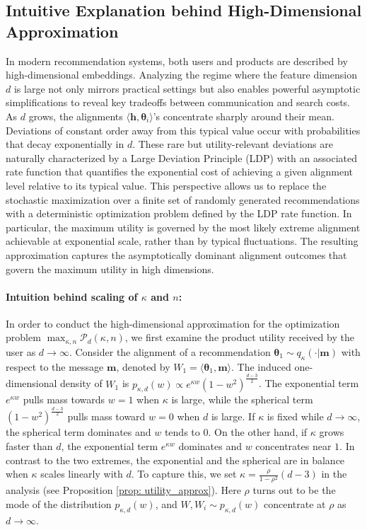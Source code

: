 \documentclass[12pt]{article}
\theoremstyle{definition}
\theoremstyle{remark}
\begin{document}
\subsection{Intuitive Explanation behind High-Dimensional Approximation}
\label{sec:intuitive_high_dim}
In modern recommendation systems, both users and products are described by high-dimensional embeddings. Analyzing the regime where the feature dimension $d$ is large not only mirrors practical settings but also enables powerful asymptotic simplifications to reveal key tradeoffs between communication and search costs. As $d$ grows, the alignments $\langle \mathbf{h}, \boldsymbol{\theta}_i \rangle$'s concentrate sharply around their mean. Deviations of constant order away from this typical value occur with probabilities that decay exponentially in $d$. These rare but utility-relevant deviations are naturally characterized by a Large Deviation Principle (LDP) with an associated rate function that quantifies the exponential cost of achieving a given alignment level relative to its typical value. This perspective allows us to replace the stochastic maximization over a finite set of randomly generated recommendations with a deterministic optimization problem defined by the LDP rate function. In particular, the maximum utility is governed by the most likely extreme alignment achievable at exponential scale, rather than by typical fluctuations. The resulting approximation captures the asymptotically dominant alignment outcomes that govern the maximum utility in high dimensions.

\paragraph{Intuition behind scaling of $\kappa$ and $n$:} In order to conduct the high-dimensional approximation for the optimization problem $\max_{\kappa, n} \mathcal{P}_d(\kappa, n)$, we first examine the product utility received by the user as $d\rightarrow\infty$. Consider the alignment of a recommendation $\boldsymbol \theta_1 \sim q_{\kappa}(\cdot|\mathbf{m})$ with respect to the message $\mathbf{m}$, denoted by $W_1=\langle \boldsymbol \theta_1, \mathbf{m}\rangle$. The induced one-dimensional density of $W_1$ is $p_{\kappa,d}(w) \propto e^{\kappa w} \left(1-w^2\right)^{\frac{d-3}{2}}$. The exponential term $e^{\kappa w}$ pulls mass towards $w=1$ when $\kappa$ is large, while the spherical term $\left(1-w^2\right)^{\frac{d-3}{2}}$ pulls mass toward $w=0$ when $d$ is large. If $\kappa$ is fixed while $d\rightarrow\infty$, the spherical term dominates and $w$ tends to $0$. On the other hand, if $\kappa$ grows faster than $d$, the exponential term $e^{\kappa w}$ dominates and $w$ concentrates near $1$. In contrast to the two extremes, the exponential and the spherical are in balance when $\kappa$ scales linearly with $d$. To capture this, we set $\kappa=\frac{\rho}{1-\rho^2}(d-3)$ in the analysis (see Proposition \ref{prop: utility_approx}). Here $\rho$ turns out to be the mode of the distribution $p_{\kappa,d}(w)$, and $W, W_i \sim p_{\kappa,d}(w)$ concentrate at $\rho$ as $d \to \infty$.
\end{document}
